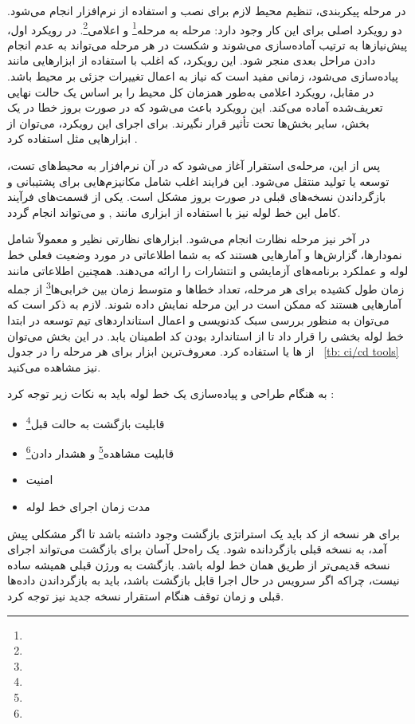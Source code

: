 در مرحله پیکربندی، تنظیم محیط لازم برای نصب و استفاده از نرم‌افزار انجام می‌شود. دو رویکرد اصلی برای این کار وجود دارد: مرحله به مرحله\footnote{} و اعلامی\footnote{}. در رویکرد اول، پیش‌نیازها به ترتیب آماده‌سازی می‌شوند و شکست در هر مرحله می‌تواند به عدم انجام دادن مراحل بعدی منجر شود. این رویکرد، که اغلب با استفاده از ابزارهایی مانند  پیاده‌سازی می‌شود، زمانی مفید است که نیاز به اعمال تغییرات جزئی بر محیط باشد. در مقابل، رویکرد اعلامی به‌طور همزمان کل محیط را بر اساس یک حالت نهایی تعریف‌شده آماده می‌کند. این رویکرد باعث می‌شود که در صورت بروز خطا در یک بخش، سایر بخش‌ها تحت تأثیر قرار نگیرند. برای اجرای این رویکرد، می‌توان از ابزارهایی مثل  استفاده کرد \cite{Devopsgitops}.

پس از این، مرحله‌ی استقرار آغاز می‌شود که در آن نرم‌افزار به محیط‌های تست، توسعه یا تولید منتقل می‌شود. این فرایند اغلب شامل مکانیزم‌هایی برای پشتیبانی و بازگرداندن نسخه‌های قبلی در صورت بروز مشکل است. یکی از قسمت‌های فرآیند کامل این خط لوله نیز با استفاده از ابزاری مانند ,  و  می‌تواند انجام گردد. 

در آخر نیز مرحله نظارت انجام می‌شود. ابزارهای نظارتی نظیر  و  معمولاً شامل نمودارها، گزارش‌ها و آمارهایی هستند که به شما اطلاعاتی در مورد وضعیت فعلی خط لوله و عملکرد برنامه‌های آزمایشی و انتشارات را ارائه می‌دهند. همچنین اطلاعاتی مانند زمان طول کشیده برای هر مرحله، تعداد خطاها و متوسط زمان بین خرابی‌ها\footnote{} از جمله آمارهایی هستند که ممکن است در این مرحله نمایش داده شوند. لازم به ذکر است که می‌توان به منظور بررسی سبک کدنویسی و اعمال استانداردهای تیم توسعه در ابتدا خط لوله بخشی را قرار داد تا از استاندارد بودن کد اطمینان یابد. در این بخش می‌توان از ها یا  استفاده کرد. معروف‌ترین ابزار برای هر مرحله را در جدول ~\ref{tb: ci/cd tools} نیز مشاهده می‌کنید.

به هنگام طراحی و پیاده‌سازی یک خط لوله  باید به نکات زیر توجه کرد \cite{DevopsCD, Devopsgitops, DevopsCICD2}:
\begin{itemize}
	\item قابلیت بازگشت به حالت قبل\footnote{} 
	\item قابلیت مشاهده\footnote{} و هشدار دادن\footnote{}
	\item امنیت
	\item مدت زمان اجرای خط لوله
\end{itemize}

برای هر نسخه از کد باید یک استراتژی بازگشت وجود داشته باشد تا اگر مشکلی پیش آمد، به نسخه قبلی بازگردانده شود. یک راه‌حل آسان برای بازگشت می‌تواند اجرای نسخه قدیمی‌تر از طریق همان خط لوله  باشد. بازگشت به ورژن قبلی همیشه ساده نیست، چراکه اگر سرویس در حال اجرا قابل بازگشت باشد، باید به بازگرداندن داده‌ها قبلی و زمان توقف هنگام استقرار نسخه جدید نیز توجه کرد.

